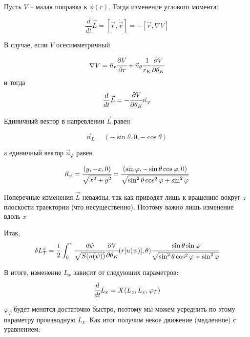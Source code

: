 Пусть $V$ – малая поправка к $\phi(r)$. Тогда изменение углового момента:

\begin{equation*}
\frac{d}{dt} \vec{L} = [\vec{r},\dot{\vec{v}}] = -[\vec{r},\nabla V]
\end{equation*}

В случае, если $V$ осесимметричный

\begin{equation*}
\nabla V = \vec{n}_r \cfrac{\partial V}{\partial r} + \vec{n}_{\theta} \cfrac{1}{r_K}
\cfrac{\partial V}{\partial \theta_K}
\end{equation*}
и тогда
\begin{equation*}
\frac{d}{dt} \vec{L} = -\cfrac{\partial V}{\partial \theta_K} \vec{n}_{\varphi}
\end{equation*}

Единичный вектор в напревлении $\vec{L}$ равен

\begin{equation*}
\vec{n}_{L} = (-\sin{\theta},0,-\cos{\theta})
\end{equation*}

а единичный вектор $\vec{n}_{\varphi}$ равен

\begin{equation*}
\vec{n}_{\varphi} = \cfrac{(y,-x,0)}{\sqrt{x^2+y^2}} = \cfrac{(\sin{\varphi},-\sin{\theta} \cos{\varphi},0)}{\sqrt{\sin^2{\theta} \cos^2{\varphi}+\sin^2{\varphi}}}
\end{equation*}

Поперечные изменения $\vec{L}$ неважны, так как приводят лишь к вращению вокруг $z$
плоскости траектории (что несущественно). Поэтому важно лишь изменение вдоль $x$

Итак, 
\begin{equation*}
\delta L^{x}_{T} = \frac{1}{2}\int_{0}^{\pi} {\cfrac{d\psi}{\sqrt{S(u(\psi))}}}
\cfrac{\partial V}{\partial \theta_K}(r[u(\psi)], \theta)
\cfrac{\sin{\theta} \sin{\varphi}}{\sqrt{\sin^2{\theta} \cos^2{\varphi}+\sin^2{\varphi}}}
\end{equation*}

В итоге, изменение $L_x$ зависит от следующих параметров: 
\begin{equation*}
\cfrac{d}{dt}L_x = X(L_z,L_x,\varphi_T)
\end{equation*}

$\varphi_T$ будет менятся достаточно быстро, поэтому мы можем
усреднить по этому параметру производную $\dot{L}_x$. Как итог получим некое движение (медленное) с уравнением:

